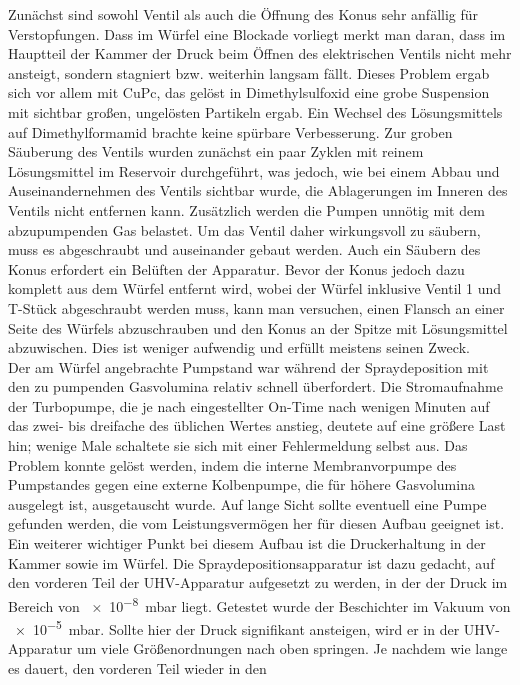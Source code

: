 Zunächst sind sowohl Ventil als auch die Öffnung des Konus sehr anfällig für Verstopfungen. Dass im
Würfel eine Blockade vorliegt merkt man daran, dass im Hauptteil der Kammer der
Druck beim Öffnen des elektrischen Ventils nicht mehr ansteigt, sondern stagniert bzw. weiterhin
langsam fällt. Dieses Problem ergab sich vor allem mit CuPc, das gelöst in Dimethylsulfoxid eine
grobe Suspension mit sichtbar großen, ungelösten Partikeln ergab. Ein Wechsel des Lösungsmittels auf
Dimethylformamid brachte keine spürbare Verbesserung. Zur groben Säuberung des Ventils wurden
zunächst ein paar Zyklen mit reinem Lösungsmittel im Reservoir durchgeführt, was jedoch, wie bei
einem Abbau und Auseinandernehmen des Ventils sichtbar wurde, die Ablagerungen im Inneren des
Ventils nicht entfernen kann. Zusätzlich werden die Pumpen unnötig mit dem abzupumpenden Gas
belastet. Um das Ventil daher wirkungsvoll zu säubern, muss es abgeschraubt und auseinander gebaut
werden. Auch ein Säubern des Konus erfordert ein Belüften der Apparatur. Bevor der Konus jedoch
dazu komplett aus dem Würfel entfernt wird, wobei der Würfel inklusive Ventil 1 und T-Stück
abgeschraubt werden muss, kann man versuchen, einen Flansch an einer Seite des Würfels abzuschrauben
und den Konus an der Spitze mit Lösungsmittel abzuwischen. Dies ist weniger aufwendig und
erfüllt meistens seinen Zweck.
\\
Der am Würfel angebrachte Pumpstand war während der Spraydeposition mit den zu pumpenden Gasvolumina
relativ schnell überfordert. Die Stromaufnahme der Turbopumpe, die je nach eingestellter On-Time nach
wenigen Minuten auf das zwei- bis dreifache des üblichen Wertes anstieg, deutete auf eine größere
Last hin; wenige Male schaltete sie sich mit einer Fehlermeldung selbst aus. Das Problem konnte gelöst werden,
indem die interne Membranvorpumpe des Pumpstandes gegen eine externe Kolbenpumpe, die für höhere
Gasvolumina ausgelegt ist, ausgetauscht wurde.
Auf lange Sicht sollte eventuell eine Pumpe gefunden werden, die vom Leistungsvermögen her für
diesen Aufbau geeignet ist.
\\
Ein weiterer wichtiger Punkt bei diesem Aufbau ist die Druckerhaltung in der Kammer sowie im Würfel.
Die Spraydepositionsapparatur ist dazu gedacht, auf den vorderen Teil der UHV-Apparatur aufgesetzt
zu werden, in der der Druck im Bereich von \SI{e-8}{mbar} liegt. Getestet wurde der Beschichter im Vakuum von
\SI{e-5}{mbar}. Sollte hier der Druck signifikant ansteigen, wird er in der UHV-Apparatur um viele
Größenordnungen nach oben springen. Je nachdem wie lange es dauert, den vorderen Teil wieder in den
